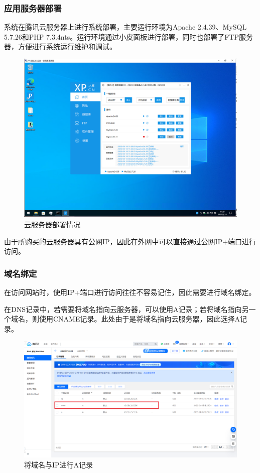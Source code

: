 \documentclass[winfonts,UTF8,a4paper]{ctexart}
\begin{document}
\subsubsection{应用服务器部署}
系统在腾讯云服务器上进行系统部署，主要运行环境为Apache 2.4.39、MySQL 5.7.26和PHP 7.3.4nts。运行环境通过小皮面板进行部署，同时也部署了FTP服务器，方便进行系统运行维护和调试。
\begin{figure}[H]
	\centering
	\includegraphics[width=0.7\linewidth]{pic/screenshot022}
	\caption{云服务器部署情况}
	\label{云服务器部署情况}
\end{figure}

由于所购买的云服务器具有公网IP，因此在外网中可以直接通过公网IP+端口进行访问。

\subsubsection{域名绑定}
在访问网站时，使用IP+端口进行访问往往不容易记住，因此需要进行域名绑定。

在DNS记录中，若需要将域名指向云服务器，可以使用A记录；若将域名指向另一个域名，则使用CNAME记录。此处由于是将域名指向云服务器，因此选择A记录。

\begin{figure}[H]
	\centering
	\includegraphics[width=0.7\linewidth]{pic/screenshot025}
	\caption{将域名与IP进行A记录}
	\label{fig:screenshot025}
\end{figure}
\end{document}
